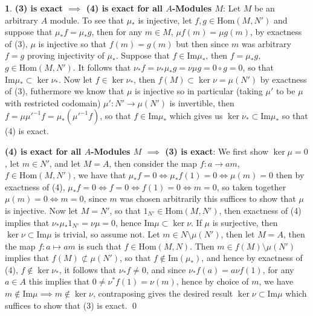 \documentclass[11pt]{article}
\theoremstyle{definition}
\newtheorem{pb}{}
\newcommand{\ho}{\text{Hom}}
\begin{document}
\begin{pb}
        \textbf{(3) is exact \(\mathbf{\implies}\) (4) is exact for all \(A\)-Modules \(M\)}: Let \(M\) be an arbitrary \(A\) module.
        To see that \(\mu_*\) is injective, let \(f,g \in \ho(M,N')\) and suppose that \(\mu_*f = \mu_*g\), then for any \(m \in M\), \(\mu f(m) = \mu g(m)\), by exactness of (3), \(\mu\) is injective so that \(f(m) = g(m)\) but then since \(m\) was arbitrary \(f = g\) proving injectivity of \(\mu_*\). Suppose that \(f \in \text{Im}\mu_*\), then \(f = \mu_*g\), \(g \in \ho(M,N')\). It follows that \(\nu_*f = \nu_* \mu_* g = \nu\mu g = 0 \circ g = 0\), so that \(\text{Im}\mu_* \subset \ker \nu_*\). Now let \(f \in \ker \nu_*\), then \(f(M) \subset \ker \nu = \mu(N')\) by exactness of (3), futhermore we know that \(\mu\) is injective so in particular (taking \(\mu'\) to be \(\mu\) with restricted codomain) \(\mu': N' \to \mu(N')\) is invertible, then \(f = \mu \mu'^{-1}f = \mu_*(\mu'^{-1}f)\), so that \(f \in \text{Im}\mu_*\) which gives us \(\ker \nu_* \subset \text{Im}\mu_*\) so that (4) is exact.

        \textbf{(4) is exact for all \(A\)-Modules \(M\) \(\mathbf{\implies}\) (3) is exact}:
        We first show \(\ker \mu = 0\), let \(m \in N'\), and let \(M = A\), then consider the map \(f:a \to am\), \(f \in \ho(M,N')\), we have that \(\mu_*f = 0 \iff \mu_*f(1) = 0 \iff \mu(m) = 0\) then by exactness of (4), \(\mu_*f = 0 \iff f = 0 \iff f(1) = 0 \iff m = 0\), so taken together \(\mu(m) = 0 \iff m = 0\), since \(m\) was chosen arbitrarily this suffices to show that \(\mu\) is injective. Now let \(M = N'\), so that \(1_{N'} \in \ho(M,N')\), then exactness of (4) implies that \(\nu_*\mu_*1_{N'} = \nu\mu = 0\), hence \(\text{Im}\mu \subset \ker \nu\). If \(\mu\) is surjective, then \(\ker \nu \subset \text{Im} \mu\) is trivial, so assume not. Let \(m \in N \setminus \mu(N')\), then let \(M = A\), then the map \(f: a \mapsto am\) is such that \(f \in \ho(M,N)\). Then \(m \in f(M) \setminus \mu(N')\) implies that \(f(M) \not \subset \mu(N')\), so that \(f \not \in \text{Im}(\mu_*)\), and hence by exactness of (4), \(f \not \in \ker \nu_*\), it follows that \(\nu_*f \neq 0\), and since \(\nu_*f(a) = a\nu f(1)\), for any \(a \in A\) this implies that \(0 \neq \nu^*f(1) = \nu(m)\), hence by choice of \(m\), we have \(m \not \in \text{Im} \mu \implies m \not \in \ker \nu\), contraposing gives the desired result \(\ker \nu \subset \text{Im}\mu\) which suffices to show that (3) is exact. \qed
    \end{pb}
\end{document}
